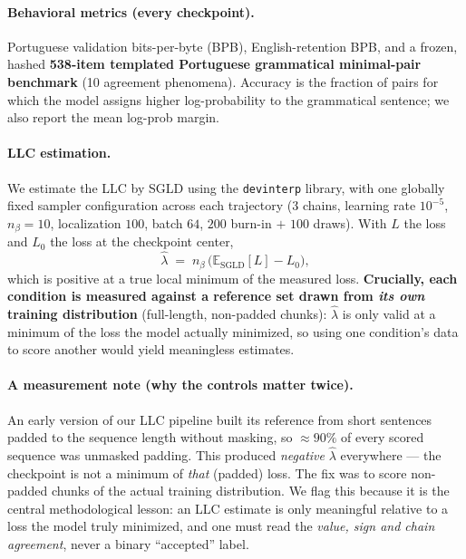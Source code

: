 \documentclass[11pt]{article}
\newcommand{\lhat}{\hat{\lambda}}
\begin{document}
\paragraph{Behavioral metrics (every checkpoint).} Portuguese validation
bits-per-byte (BPB), English-retention BPB, and a frozen, hashed \textbf{538-item
templated Portuguese grammatical minimal-pair benchmark} (10 agreement
phenomena). Accuracy is the fraction of pairs for which the model assigns higher
log-probability to the grammatical sentence; we also report the mean log-prob
margin.

\paragraph{LLC estimation.} We estimate the LLC by SGLD
\cite{lau2024,hoogland2024} using the \texttt{devinterp} library, with one
globally fixed sampler configuration across each trajectory (3 chains, learning
rate $10^{-5}$, $n_\beta\!=\!10$, localization $100$, batch $64$, $200$ burn-in $+$
$100$ draws). With $L$ the loss and $L_0$ the loss at the checkpoint center,
\begin{equation}
  \lhat \;=\; n_\beta \,\big(\mathbb{E}_{\text{SGLD}}[L] - L_0\big),
\end{equation}
which is positive at a true local minimum of the measured loss. \textbf{Crucially,
each condition is measured against a reference set drawn from \emph{its own}
training distribution} (full-length, non-padded chunks): $\lhat$ is only valid at
a minimum of the loss the model actually minimized, so using one condition's data
to score another would yield meaningless estimates.

\paragraph{A measurement note (why the controls matter twice).} An early version
of our LLC pipeline built its reference from short sentences padded to the
sequence length without masking, so $\approx\!90\%$ of every scored sequence was
unmasked padding. This produced \emph{negative} $\lhat$ everywhere --- the
checkpoint is not a minimum of \emph{that} (padded) loss. The fix was to score
non-padded chunks of the actual training distribution. We flag this because it is
the central methodological lesson: an LLC estimate is only meaningful relative to
a loss the model truly minimized, and one must read the \emph{value, sign and
chain agreement}, never a binary ``accepted'' label.
\end{document}
